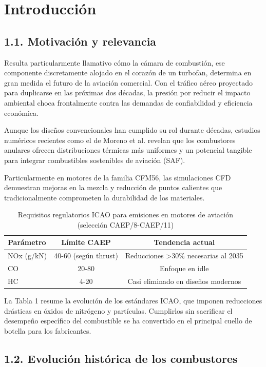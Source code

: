 \section{Introducción}

\subsection{1.1. Motivación y relevancia}

Resulta particularmente llamativo cómo la cámara de combustión, ese componente discretamente alojado en el corazón de un turbofan, determina en gran medida el futuro de la aviación comercial. Con el tráfico aéreo proyectado para duplicarse en las próximas dos décadas, la presión por reducir el impacto ambiental choca frontalmente contra las demandas de confiabilidad y eficiencia económica. 

Aunque los diseños convencionales han cumplido su rol durante décadas, estudios numéricos recientes como el de Moreno et al. revelan que los combustores anulares ofrecen distribuciones térmicas más uniformes y un potencial tangible para integrar combustibles sostenibles de aviación (SAF). 

Particularmente en motores de la familia CFM56, las simulaciones CFD demuestran mejoras en la mezcla y reducción de puntos calientes que tradicionalmente comprometen la durabilidad de los materiales. 

\begin{table}[h]
\centering
\caption{Requisitos regulatorios ICAO para emisiones en motores de aviación (selección CAEP/8-CAEP/11)}
\label{tab:icao_requirements}
\begin{tabular}{lcc}
\hline
Parámetro & Límite CAEP & Tendencia actual \\
\hline
NOx (g/kN) & 40-60 (según thrust) & Reducciones >30\% necesarias al 2035 \\
CO & 20-80 & Enfoque en idle \\
HC & 4-20 & Casi eliminado en diseños modernos \\
\hline
\end{tabular}
\end{table}

La Tabla 1 resume la evolución de los estándares ICAO, que imponen reducciones drásticas en óxidos de nitrógeno y partículas. Cumplirlos sin sacrificar el desempeño específico del combustible se ha convertido en el principal cuello de botella para los fabricantes.

\subsection{1.2. Evolución histórica de los combustores}

